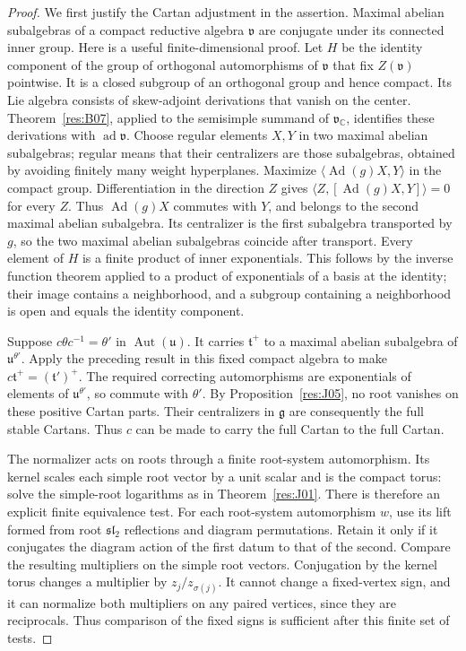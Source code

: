 \begin{proof}
We first justify the Cartan adjustment in the assertion.
Maximal abelian subalgebras of a compact reductive algebra
\(\mathfrak v\) are conjugate under its connected inner group.
Here is a useful finite-dimensional proof. Let \(H\) be the
identity component of the group of orthogonal automorphisms
of \(\mathfrak v\) that fix \(Z(\mathfrak v)\) pointwise.
It is a closed subgroup of an orthogonal group and hence compact.
Its Lie algebra consists of skew-adjoint derivations that vanish
on the center. Theorem~\ref{res:B07}, applied to the semisimple
summand of \(\mathfrak v_{\mathbb C}\), identifies these
derivations with \(\operatorname{ad}\mathfrak v\).
Choose regular elements \(X,Y\)
in two maximal abelian subalgebras; regular means that their
centralizers are those subalgebras, obtained by avoiding finitely
many weight hyperplanes. Maximize
\(\langle\operatorname{Ad}(g)X,Y\rangle\) in the compact group.
Differentiation in the direction \(Z\) gives
\(\langle Z,[\operatorname{Ad}(g)X,Y]\rangle=0\) for every \(Z\).
Thus \(\operatorname{Ad}(g)X\) commutes with \(Y\), and belongs
to the second maximal abelian subalgebra. Its centralizer is
the first subalgebra transported by \(g\), so the two maximal
abelian subalgebras coincide after transport.
Every element of \(H\) is a finite product of inner
exponentials. This follows by the inverse
function theorem applied to a product of exponentials of a
basis at the identity; their image contains a neighborhood,
and a subgroup containing a neighborhood is open and equals
the identity component.

Suppose \(c\theta c^{-1}=\theta'\) in
\(\operatorname{Aut}(\mathfrak u)\).
It carries \(\mathfrak t^+\) to a maximal abelian subalgebra
of \(\mathfrak u^{\theta'}\).
Apply the preceding result in this fixed compact algebra to
make \(c\mathfrak t^+=(\mathfrak t')^+\).
The required correcting automorphisms are exponentials of
elements of \(\mathfrak u^{\theta'}\), so commute with \(\theta'\).
By Proposition~\ref{res:J05}, no root vanishes on these
positive Cartan parts. Their centralizers in \(\mathfrak g\)
are consequently the full stable Cartans. Thus \(c\) can
be made to carry the full Cartan to the full Cartan.

The normalizer acts on roots through a finite root-system
automorphism. Its kernel scales each simple root vector
by a unit scalar and is the compact torus: solve the
simple-root logarithms as in Theorem~\ref{res:J01}.
There is therefore an explicit finite equivalence test.
For each root-system automorphism \(w\), use its lift formed
from root \(\mathfrak{sl}_2\) reflections and diagram permutations.
Retain it only if it conjugates the diagram action of the
first datum to that of the second. Compare the resulting
multipliers on the simple root vectors. Conjugation by the
kernel torus changes a multiplier by \(z_j/z_{\sigma(j)}\).
It cannot change a fixed-vertex sign, and it can normalize
both multipliers on any paired vertices, since they are
reciprocals. Thus comparison of the fixed signs is sufficient
after this finite set of tests.


\end{proof}
